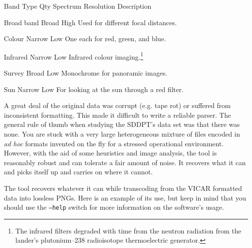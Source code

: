 {
    \bTABLE[split=repeat,option=stretch]
    \setupTABLE[column][5]
        [width=.43\textwidth,
        align=yes]
    \setupTABLE[row][each][align=center]
    \setupTABLE[4][1][align=center]

\bTABLEhead
    \bTR[bottomframe=on]
      \bTH  Band Type \eTH
      \bTH  Qty \eTH
      \bTH  Spectrum \eTH
      \bTH  Resolution \eTH
      \bTH  Description \eTH
    \eTR
\eTABLEhead

\bTABLEbody
    \bTR
      \bTC Broad band \eTC
       \eTC
      \bTC Broad \eTC
      \bTC High \eTC
      \bTC Used for different focal distances. \eTC
    \eTR

    \bTR
      \bTC Colour \eTC
       \eTC
      \bTC Narrow \eTC
      \bTC Low \eTC
      \bTC One each for red, green, and blue. \eTC
    \eTR

    \bTR
      \bTC Infrared \eTC
       \eTC
      \bTC Narrow \eTC
      \bTC Low \eTC
      \bTC Infrared colour imaging.\footnote{The infrared filters degraded with time from the neutron radiation from the lander's plutonium--238 radioisotope thermoelectric generator.} \eTC
    \eTR

    \bTR
      \bTC Survey \eTC
       \eTC
      \bTC Broad \eTC
      \bTC Low \eTC
      \bTC Monochrome for panoramic images. \eTC
    \eTR
    
    \bTR
      \bTC Sun \eTC
       \eTC
      \bTC Narrow \eTC
      \bTC Low \eTC
      \bTC For looking at the sun through a red filter. \eTC
    \eTR

\eTABLEbody

\eTABLE
}

A great deal of the original data was corrupt (e.g. tape rot) or suffered from inconsistent formatting. This made it difficult to write a reliable parser. The general rule of thumb when studying the SDDPT's data set was that there was none. You are stuck with a very large heterogeneous mixture of files encoded in {\it ad hoc} formats invented on the fly for a stressed operational environment. However, with the aid of some heuristics and image analysis, the tool is reasonably robust and can tolerate a fair amount of noise. It recovers what it can and picks itself up and carries on where it cannot.

The tool recovers whatever it can while transcoding from the VICAR formatted data into lossless PNGs. Here is an example of its use, but keep in mind that you should use the {\tt --help} switch for more information on the software's usage.

